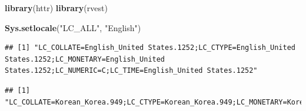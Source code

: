 \documentclass[]{book}
\newenvironment{Shaded}{\begin{snugshade}}{\end{snugshade}}
\newcommand{\DataTypeTok}[1]{\textcolor[rgb]{0.13,0.29,0.53}{#1}}
\newcommand{\DecValTok}[1]{\textcolor[rgb]{0.00,0.00,0.81}{#1}}
\newcommand{\KeywordTok}[1]{\textcolor[rgb]{0.13,0.29,0.53}{\textbf{#1}}}
\newcommand{\NormalTok}[1]{#1}
\newcommand{\OperatorTok}[1]{\textcolor[rgb]{0.81,0.36,0.00}{\textbf{#1}}}
\newcommand{\OtherTok}[1]{\textcolor[rgb]{0.56,0.35,0.01}{#1}}
\newcommand{\StringTok}[1]{\textcolor[rgb]{0.31,0.60,0.02}{#1}}
\begin{document}
\begin{Shaded}
\begin{Highlighting}[]
\KeywordTok{library}\NormalTok{(httr)}
\KeywordTok{library}\NormalTok{(rvest)}

\KeywordTok{Sys.setlocale}\NormalTok{(}\StringTok{"LC_ALL"}\NormalTok{, }\StringTok{"English"}\NormalTok{)}
\end{Highlighting}
\end{Shaded}

\begin{verbatim}
## [1] "LC_COLLATE=English_United States.1252;LC_CTYPE=English_United States.1252;LC_MONETARY=English_United States.1252;LC_NUMERIC=C;LC_TIME=English_United States.1252"
\end{verbatim}

\begin{Shaded}
\end{Shaded}

\begin{verbatim}
## [1] "LC_COLLATE=Korean_Korea.949;LC_CTYPE=Korean_Korea.949;LC_MONETARY=Korean_Korea.949;LC_NUMERIC=C;LC_TIME=Korean_Korea.949"
\end{verbatim}
\end{document}
